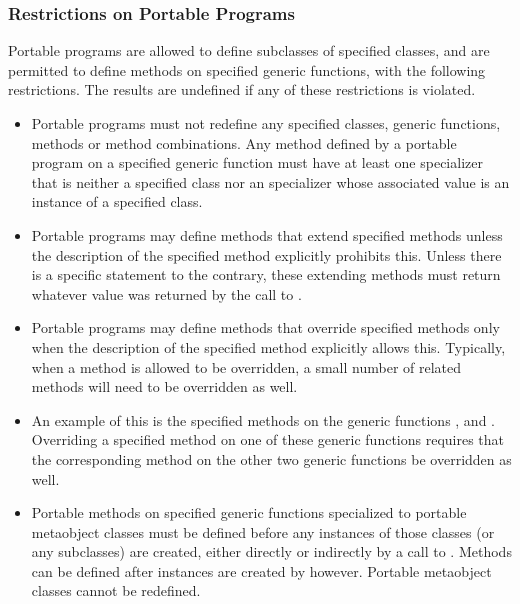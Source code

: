 \subsubsection{Restrictions on Portable Programs}

Portable programs are allowed to define subclasses of specified classes, and are
permitted to define methods on specified generic functions, with the following
restrictions. The results are undefined if any of these restrictions is
violated. 


  \begin{itemize}
  \item Portable programs must not redefine any specified classes, generic
    functions, methods or method combinations. Any method defined by a portable
    program on a specified generic function must have at least one specializer
    that is neither a specified class nor an  specializer whose
    associated value is an instance of a specified class.

  \item Portable programs may define methods that extend specified methods
    unless the description of the specified method explicitly prohibits
    this. Unless there is a specific statement to the contrary, these extending
    methods must return whatever value was returned by the call to
    .

  \item Portable programs may define methods that override specified methods
    only when the description of the specified method explicitly allows
    this. Typically, when a method is allowed to be overridden, a small number
    of related methods will need to be overridden as well.

  \item An example of this is the specified methods on the generic functions
    ,  and
    . Overriding a specified
    method on one of these generic functions requires that the corresponding
    method on the other two generic functions be overridden as well.

  \item Portable methods on specified generic functions specialized to portable
    metaobject classes must be defined before any instances of those classes (or
    any subclasses) are created, either directly or indirectly by a call to
    . Methods can be defined after instances are created by
     however. Portable metaobject classes cannot be
    redefined.


\end{itemize}
